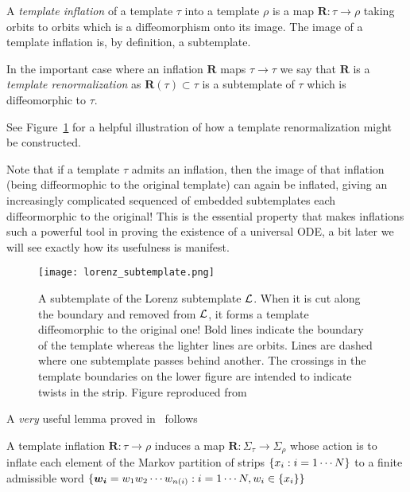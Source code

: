 \documentclass[paper.tex]{subfiles}
\begin{document}
\begin{definition}
  A  \emph{template inflation} of a template $\tau$ into a template $\rho$ is a map $\bm{R} : \tau \to \rho$ taking orbits to orbits which is a diffeomorphism onto its image.
  The image of a template inflation is, by definition, a subtemplate.
\end{definition}


\begin{definition}
  In the important case where an inflation $\bm{R}$ maps $\tau \to \tau$ we say that $\bm{R}$ is a \emph{template renormalization} as $\bm{R}(\tau) \subset \tau$ is a subtemplate of $\tau$ which
  is diffeomorphic to $\tau$.
\end{definition}


See Figure~\ref{fig:lorenz_subtemplate} for a helpful illustration of how a template renormalization might be constructed.



Note that if a template $\tau$ admits an inflation, then the image of that inflation (being diffeormophic to the original template) can again be inflated, giving an increasingly complicated sequenced of embedded
subtemplates each diffeormorphic to the original! This is the essential property that makes inflations such a powerful tool in proving the existence of a universal ODE, a bit later
we will see exactly how its usefulness is manifest.

\begin{figure}[h]
  \centering
  \texttt{[image: lorenz\_subtemplate.png]}
  \caption{A subtemplate of the Lorenz subtemplate $\mathcal{L}$. When it is cut along the boundary and removed from $\mathcal{L}$, it forms a template diffeomorphic to the original one!
    Bold lines indicate the boundary of the template whereas the lighter lines are orbits. Lines are dashed where one subtemplate passes behind another. The crossings in the template boundaries on the lower figure
    are intended to indicate twists in the strip.
    Figure reproduced from~\cite{knottyode}}\label{fig:lorenz_subtemplate}
\end{figure}

A \emph{very} useful lemma proved in~\cite{knottyode} follows


\begin{lemma}
  A template inflation $\bm{R}: \tau \to \rho$ induces a map $\bm{R}: \Sigma_\tau \to \Sigma_\rho$ whose action is to inflate each element of the Markov partition of strips $\{ x_i : i = 1\cdots N \}$ to a finite
  admissible word $\{ \bm{w_i} = w_1 w_2 \cdots w_{n(i)} : i = 1 \cdots N, w_i \in \{ x_i \} \}$\label{lemma:symbolic}
\end{lemma}
\end{document}
